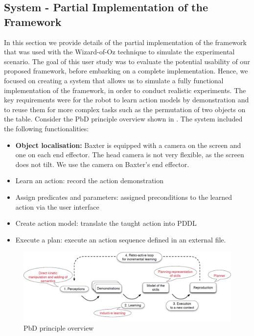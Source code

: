 \subsection{System - Partial Implementation of the Framework}\label{ssec:WoZ}
In this section we provide details of the partial implementation of the framework that was used with the Wizard-of-Oz technique to simulate the experimental scenario.
The goal of this user study was to evaluate the potential usability of our proposed framework, before embarking on a complete implementation.
Hence, we focused on creating a system that allows us to simulate a fully functional implementation of the framework, in order to conduct realistic experiments.
The key requirements were for the robot to learn action models by demonstration and to reuse them for more complex tasks such as the permutation of two objects on the table.
Consider the PbD principle overview shown in .
The system included the following functionalities:
\begin{itemize}
\item {\textbf{Object localisation:} Baxter is equipped with a camera on the screen and one on each end effector.
The head camera is not very flexible, as the screen does not tilt.
We use the camera on Baxter's end effector.}
\item Learn an action: record the action demonstration
\item Assign predicates and parameters: assigned preconditions to the learned action via the user interface
\item Create action model: translate the taught action into PDDL
\item Execute a plan: execute an action sequence defined in an external file.
\end{itemize}

  \begin{figure}[ht]
    \centering
    \includegraphics[width=\linewidth]{figures/Baxter-Case-Study}
    \caption{PbD principle overview}
    \label{fig:Baxter-Case-Study}
  \end{figure}


